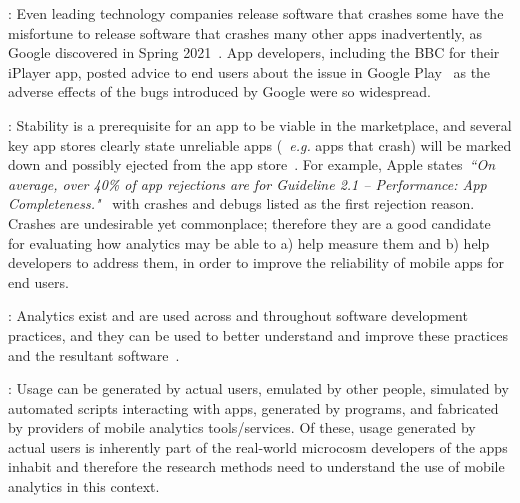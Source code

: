: Even leading technology companies release software that crashes some have the misfortune to release software that crashes many other apps inadvertently, as Google discovered in Spring 2021~. App developers, including the BBC for their iPlayer app, posted advice to end users about the issue in Google Play~ as the adverse effects of the bugs introduced by Google were so widespread.

: Stability is a prerequisite for an app to be viable in the marketplace, and several key app stores clearly state unreliable apps (~\emph{e.g.} apps that crash) will be marked down and possibly ejected from the app store~. For example, Apple states~\emph{``On average, over 40\% of app rejections are for Guideline 2.1 – Performance: App Completeness."}~ with crashes and debugs listed as the first rejection reason. %
Crashes are undesirable yet commonplace; therefore they are a good candidate for evaluating how analytics may be able to a) help measure them and b) help developers to address them, in order to improve the reliability of mobile apps for end users.


: Analytics exist and are used across and throughout software development practices, and they can be used to better understand and improve these practices and the resultant software~.

:
Usage can be generated by actual users, emulated by other people, simulated by automated scripts interacting with apps, generated by programs, and fabricated by providers of mobile analytics tools/services. Of these, usage generated by actual users is inherently part of the real-world microcosm developers of the apps inhabit and therefore the research methods need to understand the use of mobile analytics in this context. 


